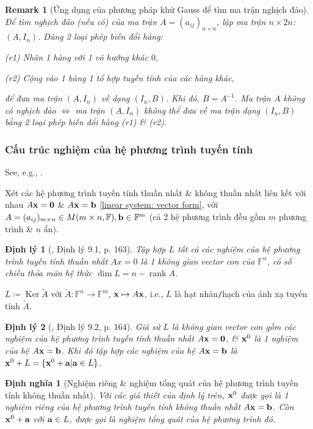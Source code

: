 \documentclass{article}
\newtheorem{dinhly}{Định lý}
\newtheorem{dinhnghia}{Định nghĩa}
\newtheorem{remark}{Remark}
\begin{document}
\begin{remark}[Ứng dụng của phương pháp khử Gauss để tìm ma trận nghịch đảo]
	Để tìm nghịch đảo (nếu có) của ma trận $A = (a_{ij})_{n\times n}$, lập ma trận $n\times2n$: $(A,I_n)$. Dùng 2 loại phép biến đổi hàng:
	\item(r1) Nhân 1 hàng với 1 vô hướng khác $0$,
	\item(r2) Cộng vào 1 hàng 1 tổ hợp tuyến tính của các hàng khác,
	
	\noindent để đưa ma trận $(A,I_n)$ về dạng $(I_n,B)$. Khi đó, $B = A^{-1}$. Ma trận $A$ không có nghịch đảo $\Leftrightarrow$ ma trận $(A,I_n)$ không thể đưa về ma trận dạng $(I_n,B)$ bằng 2 loại phép biến đổi hàng (r1) \& (r2).
\end{remark}

\subsubsection{Cấu trúc nghiệm của hệ phương trình tuyến tính}
See, e.g., \cite[Chap. 3, \S9: Cấu trúc nghiệm của hệ phương trình tuyến tính, pp. 163--165]{Hung_linear_algebra}.

Xét các hệ phương trình tuyến tính thuần nhất \& không thuần nhất liên kết với nhau $A{\bf x} = {\bf0}$ \& $A{\bf x} = {\bf b}$ \eqref{linear system: vector form}, với $A = (a_{ij})_{m\times n}\in M(m\times n,\mathbb{F}),{\bf b}\in\mathbb{F}^m$ (cả 2 hệ phương trình đều gồm $m$ phương trình \& $n$ ẩn).

\begin{dinhly}[\cite{Hung_linear_algebra}, Định lý 9.1, p. 163]
	Tập hợp $L$ tất cả các nghiệm của hệ phương trình tuyến tính thuần nhất $Ax = 0$ là 1 không gian vector con của $\mathbb{F}^n$, có số chiều thỏa mãn hệ thức $\dim L = n - \operatorname{rank}A$.
\end{dinhly}
$L\coloneqq\operatorname{Ker}\tilde{A}$ với $\tilde{A}:\mathbb{F}^n\to\mathbb{F}^m$, ${\bf x}\mapsto A{\bf x}$, i.e., $L$ là hạt nhân{\tt/}hạch của ánh xạ tuyến tính $\tilde{A}$.

\begin{dinhly}[\cite{Hung_linear_algebra}, Định lý 9.2, p. 164]
	Giả sử $L$ là không gian vector con gồm các nghiệm của hệ phương trình tuyến tính thuần nhất $A{\bf x} = {\bf0}$, \& ${\bf x}^0$ là 1 nghiệm của hệ $A{\bf x} = {\bf b}$. Khi đó tập hợp các nghiệm của hệ $A{\bf x} = {\bf b}$ là ${\bf x}^0 + L = \{{\bf x}^0 + {\bf a}|{\bf a}\in L\}$.
\end{dinhly}

\begin{dinhnghia}[Nghiệm riêng \& nghiệm tổng quát của hệ phương trình tuyến tính không thuần nhất]
	Với các giả thiết của định lý trên, ${\bf x}^0$ được gọi là 1 \emph{nghiệm riêng} của hệ phương trình tuyến tính không thuần nhất $A{\bf x} = {\bf b}$. Còn ${\bf x}^0 + {\bf a}$ với ${\bf a}\in L$, được gọi là \emph{nghiệm tổng quát} của hệ phương trình đó.
\end{dinhnghia}
\end{document}

